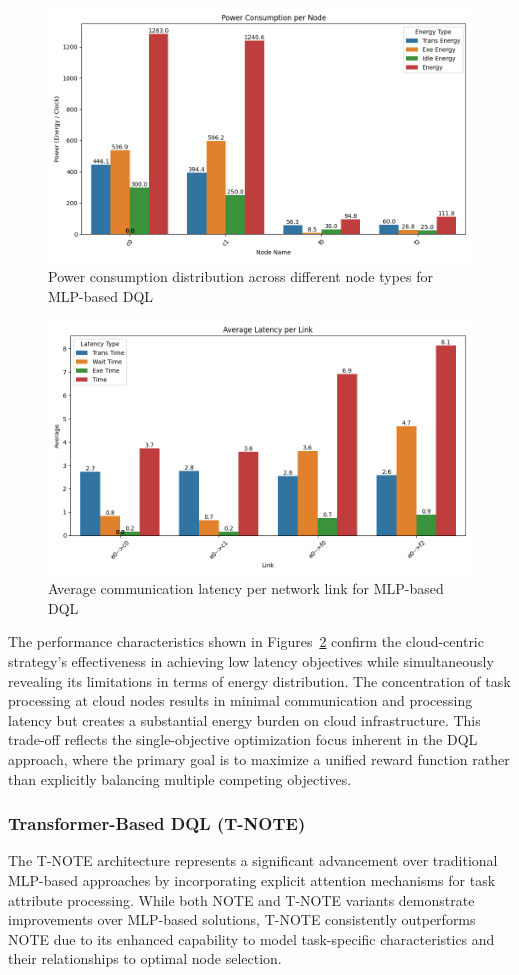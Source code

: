 \documentclass[preprint,3p,authoryear]{elsarticle}
\begin{document}
\begin{figure}[H]
    \centering
    \includegraphics[width=0.5\linewidth]{figs/MLP/power_consumption_per_node.png}
    \caption{Power consumption distribution across different node types for MLP-based DQL}
    \label{fig:mlp-power-consumption}
\end{figure}
\begin{figure}[H]
    \centering
    \includegraphics[width=0.5\linewidth]{figs/MLP/avg_latency_per_link.png}
    \caption{Average communication latency per network link for MLP-based DQL}
    \label{fig:mlp-avg-latency}
\end{figure}



The performance characteristics shown in Figures~\ref{fig:mlp-avg-latency}  confirm the cloud-centric strategy's effectiveness in achieving low latency objectives while simultaneously revealing its limitations in terms of energy distribution. The concentration of task processing at cloud nodes results in minimal communication and processing latency but creates a substantial energy burden on cloud infrastructure. This trade-off reflects the single-objective optimization focus inherent in the DQL approach, where the primary goal is to maximize a unified reward function rather than explicitly balancing multiple competing objectives.


\subsubsection{Transformer-Based DQL (T-NOTE)}\label{subsubsec:T-NOTE-analysis}

The T-NOTE architecture represents a significant advancement over traditional MLP-based approaches by incorporating explicit attention mechanisms for task attribute processing. While both NOTE and T-NOTE variants demonstrate improvements over MLP-based solutions, T-NOTE consistently outperforms NOTE due to its enhanced capability to model task-specific characteristics and their relationships to optimal node selection.
\end{document}
